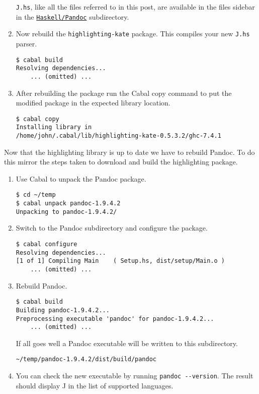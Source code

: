 \begin{enumerate}
  \texttt{J.hs}, like all the files referred to in this post, are
  available in the files sidebar in the \href{https://www.box.com/s/vqg6chj0hpysjnxhulz5}{\texttt{Haskell/Pandoc}}
  subdirectory.
\item
  Now rebuild the \texttt{highlighting-kate} package. This compiles your
  new \texttt{J.hs} parser.

\begin{verbatim}
$ cabal build
Resolving dependencies...
    ... (omitted) ...
\end{verbatim}
\item
  After rebuilding the package run the Cabal copy command to put the
  modified package in the expected library location.

\begin{verbatim}
$ cabal copy
Installing library in
/home/john/.cabal/lib/highlighting-kate-0.5.3.2/ghc-7.4.1
\end{verbatim}
\end{enumerate}

Now that the highlighting library is up to date we have to rebuild
Pandoc. To do this mirror the steps taken to download and build the
highlighting package.

\begin{enumerate}
\item
  Use Cabal to unpack the Pandoc package.

\begin{verbatim}
$ cd ~/temp
$ cabal unpack pandoc-1.9.4.2
Unpacking to pandoc-1.9.4.2/
\end{verbatim}
\item
  Switch to the Pandoc subdirectory and configure the package.

\begin{verbatim}
$ cabal configure
Resolving dependencies...
[1 of 1] Compiling Main    ( Setup.hs, dist/setup/Main.o )
    ... (omitted) ...
\end{verbatim}
\item
  Rebuild Pandoc.

\begin{verbatim}
$ cabal build 
Building pandoc-1.9.4.2...
Preprocessing executable 'pandoc' for pandoc-1.9.4.2...
    ... (omitted) ...
\end{verbatim}

  If all goes well a
  Pandoc executable will be written to this subdirectory.

\begin{verbatim}
~/temp/pandoc-1.9.4.2/dist/build/pandoc
\end{verbatim}
\item
  You can check the new executable by running
  \texttt{pandoc -{}-version}. The result should display J in the list
  of supported languages.
\end{enumerate}


